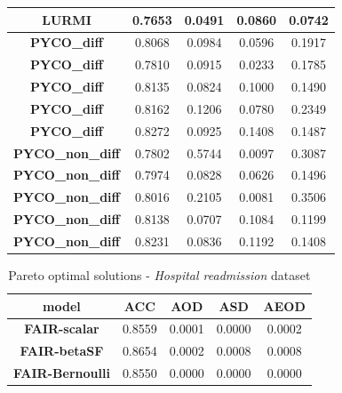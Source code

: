 \documentclass[preprint,12pt]{elsarticle}
\begin{document}
\begin{table}
\begin{tabular}{|c|c|c|c|c|}
		\textbf{LURMI}           & 0.7653       & 0.0491       & 0.0860       & 0.0742        \\ \hline
		\textbf{PYCO\_diff}      & 0.8068       & 0.0984       & 0.0596       & 0.1917        \\ \hline
		\textbf{PYCO\_diff}      & 0.7810       & 0.0915       & 0.0233       & 0.1785        \\ \hline
		\textbf{PYCO\_diff}      & 0.8135       & 0.0824       & 0.1000       & 0.1490        \\ \hline
		\textbf{PYCO\_diff}      & 0.8162       & 0.1206       & 0.0780       & 0.2349        \\ \hline
		\textbf{PYCO\_diff}      & 0.8272       & 0.0925       & 0.1408       & 0.1487        \\ \hline
		\textbf{PYCO\_non\_diff} & 0.7802       & 0.5744       & 0.0097       & 0.3087        \\ \hline
		\textbf{PYCO\_non\_diff} & 0.7974       & 0.0828       & 0.0626       & 0.1496        \\ \hline
		\textbf{PYCO\_non\_diff} & 0.8016       & 0.2105       & 0.0081       & 0.3506        \\ \hline
		\textbf{PYCO\_non\_diff} & 0.8138       & 0.0707       & 0.1084       & 0.1199        \\ \hline
		\textbf{PYCO\_non\_diff} & 0.8231       & 0.0836       & 0.1192       & 0.1408        \\ \hline
	\end{tabular}
	\label{tab:Adult}
\end{table}

\begin{table}
	\centering
	\caption{Pareto optimal solutions - \textit{Hospital readmission} dataset}
	\begin{tabular}{|c|c|c|c|c|}
		\hline
		\textbf{model}          & \textbf{ACC} & \textbf{AOD} & \textbf{ASD} & \textbf{AEOD} \\ \hline
		\textbf{FAIR-scalar}    & 0.8559     & 0.0001     & 0.0000     & 0.0002      \\ \hline
		\textbf{FAIR-betaSF}    & 0.8654     & 0.0002     & 0.0008     & 0.0008      \\ \hline
		\textbf{FAIR-Bernoulli} & 0.8550     & 0.0000            & 0.0000            & 0.0000             \\ \hline
	\end{tabular}
	\label{tab:Readmission}%
\end{table}
\end{document}
